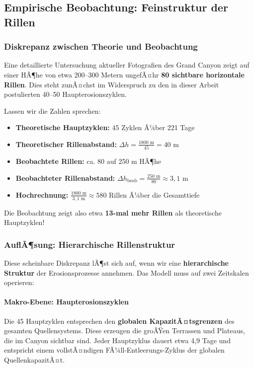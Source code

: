﻿\subsection{Empirische Beobachtung: Feinstruktur der Rillen}

\subsubsection{Diskrepanz zwischen Theorie und Beobachtung}

Eine detaillierte Untersuchung aktueller Fotografien des Grand Canyon zeigt auf einer HÃ¶he von etwa 200--300 Metern ungefÃ¤hr \textbf{80 sichtbare horizontale Rillen}. Dies steht zunÃ¤chst im Widerspruch zu den in dieser Arbeit postulierten 40--50 Haupterosionszyklen.

Lassen wir die Zahlen sprechen:

\begin{itemize}
	\item \textbf{Theoretische Hauptzyklen:} 45 Zyklen Ã¼ber 221 Tage
	\item \textbf{Theoretischer Rillenabstand:} $\Delta h = \frac{1800 \text{ m}}{45} = 40$ m
	\item \textbf{Beobachtete Rillen:} ca. 80 auf 250 m HÃ¶he
	\item \textbf{Beobachteter Rillenabstand:} $\Delta h_{\text{beob}} = \frac{250 \text{ m}}{80} \approx 3{,}1$ m
	\item \textbf{Hochrechnung:} $\frac{1800 \text{ m}}{3{,}1 \text{ m}} \approx 580$ Rillen Ã¼ber die Gesamttiefe
\end{itemize}

Die Beobachtung zeigt also etwa \textbf{13-mal mehr Rillen} als theoretische Hauptzyklen!

\subsubsection{AuflÃ¶sung: Hierarchische Rillenstruktur}

Diese scheinbare Diskrepanz lÃ¶st sich auf, wenn wir eine \textbf{hierarchische Struktur} der Erosionsprozesse annehmen. Das Modell muss auf zwei Zeitskalen operieren:

\paragraph{Makro-Ebene: Haupterosionszyklen}

Die 45 Hauptzyklen entsprechen den \textbf{globalen KapazitÃ¤tsgrenzen} des gesamten Quellensystems. Diese erzeugen die groÃŸen Terrassen und Plateaus, die im Canyon sichtbar sind. Jeder Hauptzyklus dauert etwa 4,9 Tage und entspricht einem vollstÃ¤ndigen FÃ¼ll-Entleerungs-Zyklus der globalen QuellenkapazitÃ¤t.

